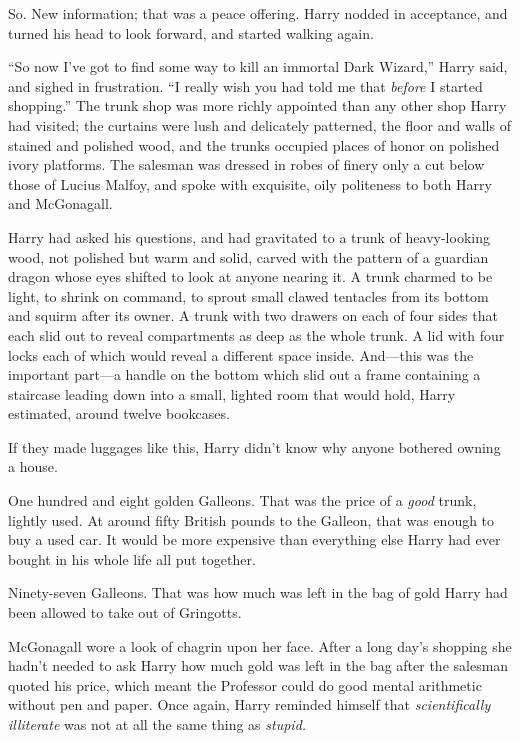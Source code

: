 So. New information; that was a peace offering. Harry nodded in acceptance, and turned his head to look forward, and started walking again.

“So now I’ve got to find some way to kill an immortal Dark Wizard,” Harry said, and sighed in frustration. “I really wish you had told me that \emph{before} I started shopping.”
\sbreak
The trunk shop was more richly appointed than any other shop Harry had visited; the curtains were lush and delicately patterned, the floor and walls of stained and polished wood, and the trunks occupied places of honor on polished ivory platforms. The salesman was dressed in robes of finery only a cut below those of Lucius Malfoy, and spoke with exquisite, oily politeness to both Harry and McGonagall.

Harry had asked his questions, and had gravitated to a trunk of heavy-looking wood, not polished but warm and solid, carved with the pattern of a guardian dragon whose eyes shifted to look at anyone nearing it. A trunk charmed to be light, to shrink on command, to sprout small clawed tentacles from its bottom and squirm after its owner. A trunk with two drawers on each of four sides that each slid out to reveal compartments as deep as the whole trunk. A lid with four locks each of which would reveal a different space inside. And—this was the important part—a handle on the bottom which slid out a frame containing a staircase leading down into a small, lighted room that would hold, Harry estimated, around twelve bookcases.

If they made luggages like this, Harry didn’t know why anyone bothered owning a house.

One hundred and eight golden Galleons. That was the price of a \emph{good} trunk, lightly used. At around fifty British pounds to the Galleon, that was enough to buy a used car. It would be more expensive than everything else Harry had ever bought in his whole life all put together.

Ninety-seven Galleons. That was how much was left in the bag of gold Harry had been allowed to take out of Gringotts.

McGonagall wore a look of chagrin upon her face. After a long day’s shopping she hadn’t needed to ask Harry how much gold was left in the bag after the salesman quoted his price, which meant the Professor could do good mental arithmetic without pen and paper. Once again, Harry reminded himself that \emph{scientifically illiterate} was not at all the same thing as \emph{stupid.}

